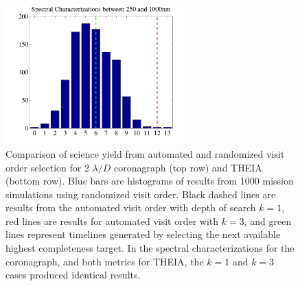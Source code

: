 \begin{figure}[ht!]
   \includegraphics[width = 2.8in,clip=true,trim=0.4in 0in 0.5in 0in]{./figures/optimhistsd}
 \caption[Science yield from automated and randomized visit order]{ \label{fig:optim_hists} Comparison of science yield from automated and randomized visit order selection for 2 $\lambda/D$ coronagraph (top row) and THEIA (bottom row).  Blue bars are histograms of results from 1000 mission simulations using randomized visit order. Black dashed lines are results from the automated visit order with depth of search $k = 1$, red lines are results for automated visit order with $k = 3$, and  green lines represent timelines generated by selecting the next available highest completeness target.  In the spectral characterizations for the coronagraph, and both metrics for THEIA, the $k=1$ and $k=3$ cases produced identical results.}
 \end{figure}
 
